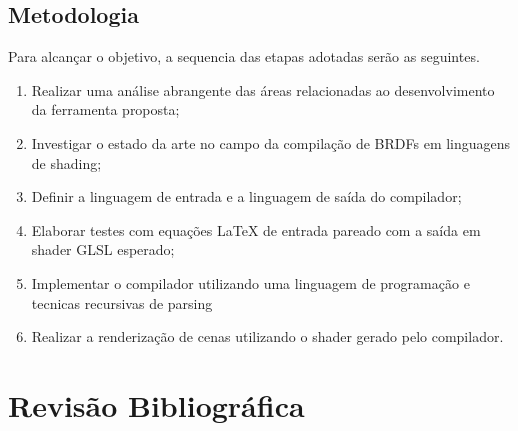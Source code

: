 \documentclass[english, 
               brazil, 
               bsc] %
               {dcomp-abntex2}
\begin{document}
\section{Metodologia}
Para alcançar o objetivo, a sequencia das etapas adotadas serão as seguintes.


\begin{enumerate}

   \item Realizar uma análise abrangente das áreas relacionadas ao desenvolvimento da ferramenta proposta;
   \item Investigar o estado da arte no campo da compilação de BRDFs em linguagens de shading;
   \item Definir a linguagem de entrada e a linguagem de saída do compilador;
   \item Elaborar testes com equações LaTeX de entrada pareado com a saída em shader GLSL esperado;
   \item Implementar o compilador utilizando uma linguagem de programação e tecnicas recursivas de parsing
   \item Realizar a renderização de cenas utilizando o shader gerado pelo compilador.

\end{enumerate}


\chapter{Revisão Bibliográfica}
\end{document}
